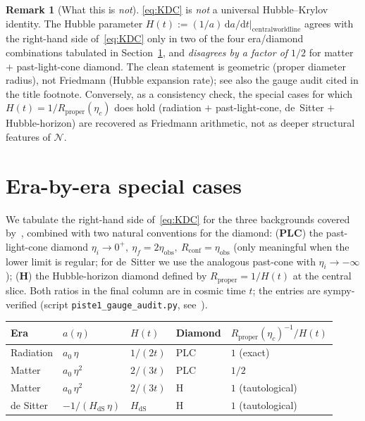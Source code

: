 \documentclass[11pt]{article}
\theoremstyle{definition}
\newtheorem{remark}[theorem]{Remark}
\newcommand{\NN}{\mathcal{N}}
\newcommand{\Rprop}{R_{\mathrm{proper}}}
\newcommand{\Rconf}{R_{\mathrm{conf}}}
\begin{document}
\begin{remark}[What this is \emph{not}]\label{rem:not}
\eqref{eq:KDC} is \emph{not} a universal Hubble--Krylov identity. The
Hubble parameter
$H(t) := (1/a)\,\mathrm{d}a/\mathrm{d}t\big|_{\mathrm{central worldline}}$
agrees with the right-hand side of~\eqref{eq:KDC} only in two of the
four era/diamond combinations tabulated in
Section~\ref{sec:eras}, and \emph{disagrees by a factor of $1/2$}
for matter $+$ past-light-cone diamond. The clean statement is
geometric (proper diameter radius), not Friedmann (Hubble
expansion rate); see also the gauge audit cited in the title
footnote. Conversely, as a consistency
check, the special cases for which $H(t) = 1/\Rprop(\eta_c)$ does
hold (radiation $+$ past-light-cone, de~Sitter $+$ Hubble-horizon)
are recovered as Friedmann arithmetic, not as deeper structural
features of $\NN$.
\end{remark}

\section{Era-by-era special cases}\label{sec:eras}

We tabulate the right-hand side of~\eqref{eq:KDC} for the three
backgrounds covered by~\cite[Thms.~3.5, 3.6, Cor.~3.7]{Remondiere2026},
combined with two natural conventions for the diamond:
(\textbf{PLC}) the past-light-cone diamond
\(\eta_i \to 0^+,\ \eta_f = 2\eta_{\mathrm{obs}},\ \Rconf = \eta_{\mathrm{obs}}\)
(only meaningful when the lower limit is regular; for de~Sitter we
use the analogous past-cone with $\eta_i\to-\infty$);
(\textbf{H}) the Hubble-horizon diamond defined by
\(\Rprop = 1/H(t)\) at the central slice. Both ratios in the
final column are in cosmic time $t$; the entries are sympy-verified
(script \texttt{piste1\_gauge\_audit.py}, see~\cite{Remondiere2026}).

\begin{center}
\renewcommand{\arraystretch}{1.25}
\begin{tabular}{lllll}
\toprule
Era & $a(\eta)$ & $H(t)$ & Diamond & $\Rprop(\eta_c)^{-1}/H(t)$ \\
\midrule
Radiation & $a_0\,\eta$         & $1/(2t)$  & PLC & $1$ (exact) \\
Matter    & $a_0\,\eta^2$        & $2/(3t)$  & PLC & $1/2$ \\
Matter    & $a_0\,\eta^2$        & $2/(3t)$  & H   & $1$ (tautological) \\
de Sitter & $-1/(H_{\mathrm{dS}}\,\eta)$ & $H_{\mathrm{dS}}$ & H   & $1$ (tautological) \\
\bottomrule
\end{tabular}
\end{center}
\end{document}
